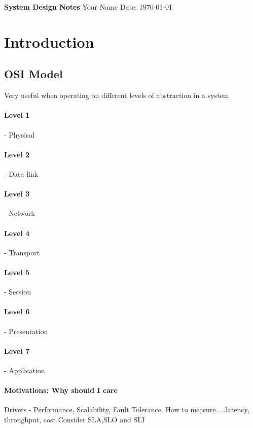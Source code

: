 \documentclass[a4paper, 11pt]{book}
\begin{document}
    \begin{titlepage}
        \centering
        \vspace*{2in}
        \Huge \textbf{System Design Notes}
        \vfill
        \Large Your Name
        \vfill
        \Large Date: \today
    \end{titlepage}

    \newpage

    \tableofcontents
    \newpage

    \section{Introduction}

    \subsection{OSI Model}
    Very useful when operating on different levels of abstraction in a system
    \paragraph{Level 1} - Physical
    \paragraph{Level 2} - Data link
    \paragraph{Level 3} - Network
    \paragraph{Level 4} - Transport
    \paragraph{Level 5} - Session
    \paragraph{Level 6} - Presentation
    \paragraph{Level 7} - Application

    \paragraph{Motivations: Why should I care}
    Drivers - Performance, Scalability, Fault Tolerance.
    How to measure.....latency, throughput, cost
    Consider SLA,SLO and SLI
\end{document}
